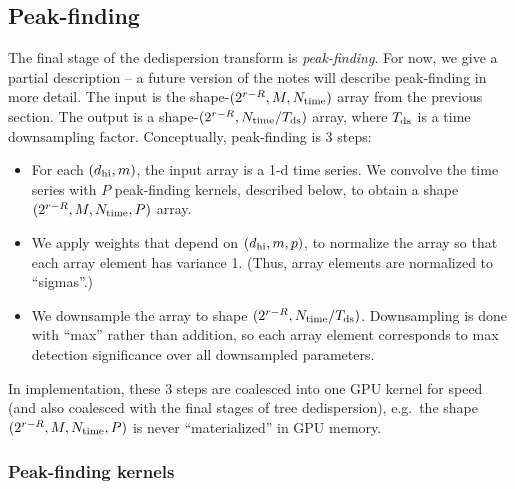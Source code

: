 \documentclass{article}
\numberwithin{equation}{section}   %
\begin{document}
\subsection{Peak-finding}
\label{sec:peak_finding}

The final stage of the dedispersion transform is {\em peak-finding}.
For now, we give a partial description -- a future version of the notes will describe
peak-finding in more detail.
The input is the shape-$(2^{r-R}, M, N_{\rm time})$ array from the previous section.
The output is a shape-$(2^{r-R}, N_{\rm time}/T_{\rm ds})$ array, where $T_{\rm ds}$ is a time downsampling factor.
Conceptually, peak-finding is 3 steps:
\begin{itemize}
\item For each $(d_{\rm hi}, m)$, the input array is a 1-d time series.
We convolve the time series with $P$ peak-finding kernels, described below, to
obtain a shape $(2^{r-R}, M, N_{\rm time}, P)$ array.
\item We apply weights that depend on $(d_{\rm hi}, m, p)$, to normalize the array 
so that each array element has variance 1. (Thus, array elements are normalized to
``sigmas''.)
\item We downsample the array to shape $(2^{r-R}, N_{\rm time}/T_{\rm ds})$.
Downsampling is done with ``max'' rather than addition, so each array element
corresponds to max detection significance over all downsampled parameters.
\end{itemize}
In implementation, these 3 steps are coalesced into one GPU kernel for speed (and also
coalesced with the final stages of tree dedispersion), e.g.\ the shape $(2^{r-R}, M, N_{\rm time}, P)$
is never ``materialized'' in GPU memory.

\subsubsection{Peak-finding kernels}
\end{document}
